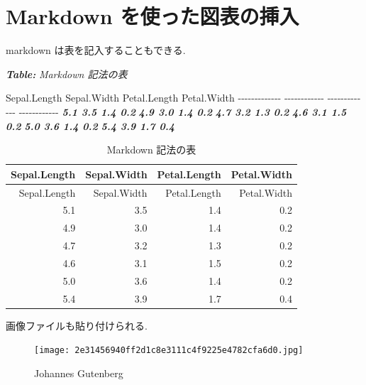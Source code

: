 \documentclass[
  xelatex,ja=standard,jafont=noto]{bxjsbook}
\newenvironment{Shaded}{\begin{snugshade}}{\end{snugshade}}
\newcommand{\AnnotationTok}[1]{\textcolor[rgb]{0.56,0.35,0.01}{\textbf{\textit{#1}}}}
\newcommand{\CommentTok}[1]{\textcolor[rgb]{0.56,0.35,0.01}{\textit{#1}}}
\newcommand{\InformationTok}[1]{\textcolor[rgb]{0.56,0.35,0.01}{\textbf{\textit{#1}}}}
\newcommand{\NormalTok}[1]{#1}
\theoremstyle{definition}
\theoremstyle{definition}
\theoremstyle{definition}
\theoremstyle{definition}
\theoremstyle{remark}
\begin{document}
\hypertarget{markdown-ux3092ux4f7fux3063ux305fux56f3ux8868ux306eux633fux5165}{%
\section{Markdown
を使った図表の挿入}\label{markdown-ux3092ux4f7fux3063ux305fux56f3ux8868ux306eux633fux5165}}

markdown は表を記入することもできる.

\begin{Shaded}
\begin{Highlighting}[]
\AnnotationTok{Table:}\CommentTok{ Markdown 記法の表}

\NormalTok{ Sepal.Length   Sepal.Width   Petal.Length   Petal.Width}
\NormalTok{{-}{-}{-}{-}{-}{-}{-}{-}{-}{-}{-}{-}{-}  {-}{-}{-}{-}{-}{-}{-}{-}{-}{-}{-}{-}  {-}{-}{-}{-}{-}{-}{-}{-}{-}{-}{-}{-}{-}  {-}{-}{-}{-}{-}{-}{-}{-}{-}{-}{-}{-}}
\InformationTok{          5.1           3.5            1.4           0.2}
\InformationTok{          4.9           3.0            1.4           0.2}
\InformationTok{          4.7           3.2            1.3           0.2}
\InformationTok{          4.6           3.1            1.5           0.2}
\InformationTok{          5.0           3.6            1.4           0.2}
\InformationTok{          5.4           3.9            1.7           0.4}
\end{Highlighting}
\end{Shaded}

\begin{longtable}[]{@{}rrrr@{}}
\caption{Markdown 記法の表}\tabularnewline
\toprule
Sepal.Length & Sepal.Width & Petal.Length & Petal.Width \\
\midrule
\endfirsthead
\toprule
Sepal.Length & Sepal.Width & Petal.Length & Petal.Width \\
\midrule
\endhead
5.1 & 3.5 & 1.4 & 0.2 \\
4.9 & 3.0 & 1.4 & 0.2 \\
4.7 & 3.2 & 1.3 & 0.2 \\
4.6 & 3.1 & 1.5 & 0.2 \\
5.0 & 3.6 & 1.4 & 0.2 \\
5.4 & 3.9 & 1.7 & 0.4 \\
\bottomrule
\end{longtable}

画像ファイルも貼り付けられる.

\begin{figure}
\centering
\texttt{[image: 2e31456940ff2d1c8e3111c4f9225e4782cfa6d0.jpg]}
\caption{Johannes Gutenberg}
\end{figure}
\end{document}
